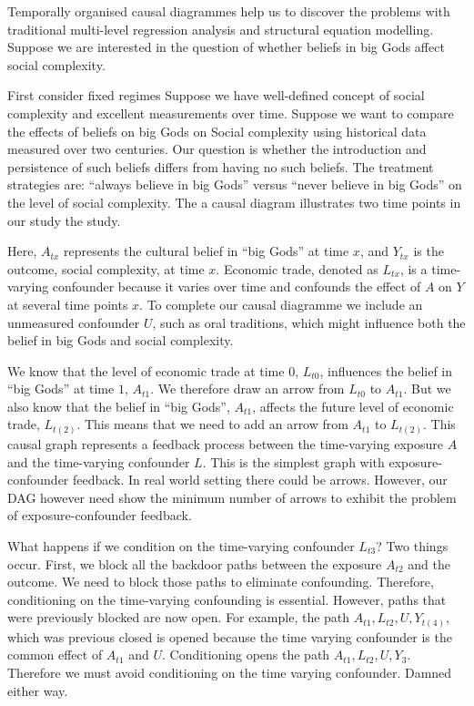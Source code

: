 \documentclass[
  singlecolumn]{report}
\begin{document}
Temporally organised causal diagrammes help us to discover the problems
with traditional multi-level regression analysis and structural equation
modelling. Suppose we are interested in the question of whether beliefs
in big Gods affect social complexity.

First consider fixed regimes Suppose we have well-defined concept of
social complexity and excellent measurements over time. Suppose we want
to compare the effects of beliefs on big Gods on Social complexity using
historical data measured over two centuries. Our question is whether the
introduction and persistence of such beliefs differs from having no such
beliefs. The treatment strategies are: ``always believe in big Gods''
versus ``never believe in big Gods'' on the level of social complexity.
The a causal diagram illustrates two time points in our study the study.

Here, \(A_{tx}\) represents the cultural belief in ``big Gods'' at time
\(x\), and \(Y_{tx}\) is the outcome, social complexity, at time \(x\).
Economic trade, denoted as \(L_{tx}\), is a time-varying confounder
because it varies over time and confounds the effect of \(A\) on \(Y\)
at several time points \(x\). To complete our causal diagramme we
include an unmeasured confounder \(U\), such as oral traditions, which
might influence both the belief in big Gods and social complexity.

We know that the level of economic trade at time \(0\), \(L_{t0}\),
influences the belief in ``big Gods'' at time \(1\), \(A_{t1}\). We
therefore draw an arrow from \(L_{t0}\) to \(A_{t1}\). But we also know
that the belief in ``big Gods'', \(A_{t1}\), affects the future level of
economic trade, \(L_{t(2)}\). This means that we need to add an arrow
from \(A_{t1}\) to \(L_{t(2)}\). This causal graph represents a feedback
process between the time-varying exposure \(A\) and the time-varying
confounder \(L\). This is the simplest graph with exposure-confounder
feedback. In real world setting there could be arrows. However, our DAG
however need show the minimum number of arrows to exhibit the problem of
exposure-confounder feedback.

What happens if we condition on the time-varying confounder \(L_{t3}\)?
Two things occur. First, we block all the backdoor paths between the
exposure \(A_{t2}\) and the outcome. We need to block those paths to
eliminate confounding. Therefore, conditioning on the time-varying
confounding is essential. However, paths that were previously blocked
are now open. For example, the path \(A_{t1}, L_{t2}, U, Y_{t(4)}\),
which was previous closed is opened because the time varying confounder
is the common effect of \(A_{t1}\) and \(U\). Conditioning opens the
path \(A_{t1}, L_{t2}, U, Y_{3}\). Therefore we must avoid conditioning
on the time varying confounder. Damned either way.
\end{document}
